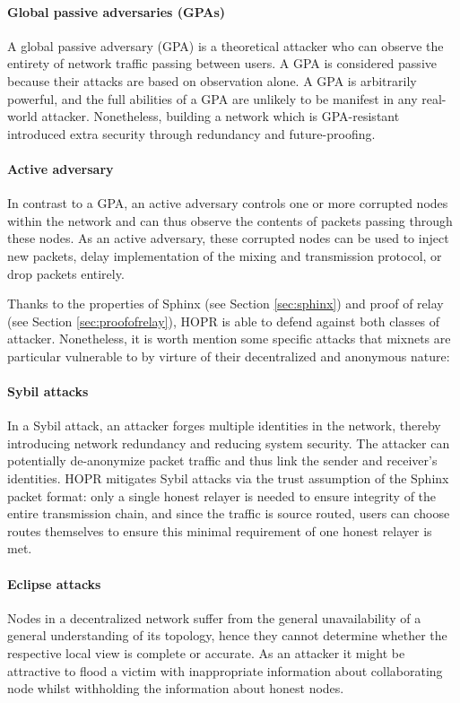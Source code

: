 \paragraph{Global passive adversaries (GPAs)} A global passive adversary (GPA) is a theoretical attacker who can observe the entirety of network traffic passing between users. A GPA is considered passive because their attacks are based on observation alone. A GPA is arbitrarily powerful, and the full abilities of a GPA are unlikely to be manifest in any real-world attacker. Nonetheless, building a network which is GPA-resistant introduced extra security through redundancy and future-proofing.
\paragraph{Active adversary} In contrast to a GPA, an active adversary controls one or more corrupted nodes within the network and can thus observe the contents of packets passing through these nodes. As an active adversary, these corrupted nodes can be used to inject new packets, delay implementation of the mixing and transmission protocol, or drop packets entirely.

Thanks to the properties of Sphinx (see Section \ref{sec:sphinx}) and proof of relay (see Section \ref{sec:proofofrelay}), HOPR is able to defend against both classes of attacker. Nonetheless, it is worth mention some specific attacks that mixnets are particular vulnerable to by virture of their decentralized and anonymous nature:

\paragraph{Sybil attacks}
In a Sybil attack, an attacker forges multiple identities in the network, thereby introducing network redundancy and reducing system security. The attacker can potentially de-anonymize packet traffic and thus link the sender and receiver's identities. HOPR mitigates Sybil attacks via the trust assumption of the Sphinx packet format: only a single honest relayer is needed to ensure integrity of the entire transmission chain, and since the traffic is source routed, users can choose routes themselves to ensure this minimal requirement of one honest relayer is met.

\paragraph{Eclipse attacks}
Nodes in a decentralized network suffer from the general unavailability of a general understanding of its topology, hence they cannot determine whether the respective local view is complete or accurate. As an attacker it might be attractive to flood a victim with inappropriate information about collaborating node whilst withholding the information about honest nodes.

